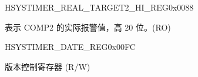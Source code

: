 \begin{register}{H}{SYSTIMER\_REAL\_TARGET2\_HI\_REG}{0x0088}\label{regdesc:SYSTIMERREALTARGET2HIREG}
%
%
\regnewline%
\begin{regdesc}\begin{reglist}
\label{fielddesc:SYSTIMERTARGET2HIRO}\item [SYSTIMER\_TARGET2\_HI\_RO] 表示 COMP2 的实际报警值，高 20 位。(RO)
\end{reglist}\end{regdesc}
\end{register}


\begin{register}{H}{SYSTIMER\_DATE\_REG}{0x00FC}\label{regdesc:SYSTIMERDATEREG}
%
\regnewline%
\begin{regdesc}\begin{reglist}
\label{fielddesc:SYSTIMERDATE}\item [SYSTIMER\_DATE] 版本控制寄存器 (R/W)
\end{reglist}\end{regdesc}
\end{register}
